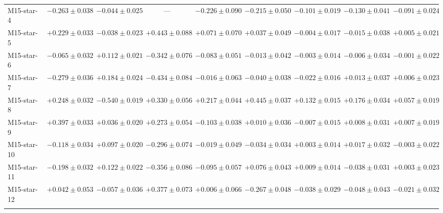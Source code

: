 \begin{table}
\begin{tabular*}{\textheight}{@{\extracolsep\fill}l c c c c c c c c@{}}
M15-star-4 & $-0.263 \pm 0.038$ & $-0.044 \pm 0.025$ & --- & $-0.226 \pm 0.090$ & $-0.215 \pm 0.050$ & $-0.101 \pm 0.019$ & $-0.130 \pm 0.041$ & $-0.091 \pm 0.024$ \\ 
M15-star-5 & $+0.229 \pm 0.033$ & $-0.038 \pm 0.023$ & $+0.443 \pm 0.088$ & $+0.071 \pm 0.070$ & $+0.037 \pm 0.049$ & $-0.004 \pm 0.017$ & $-0.015 \pm 0.038$ & $+0.005 \pm 0.021$ \\ 
M15-star-6 & $-0.065 \pm 0.032$ & $+0.112 \pm 0.021$ & $-0.342 \pm 0.076$ & $-0.083 \pm 0.051$ & $-0.013 \pm 0.042$ & $-0.003 \pm 0.014$ & $-0.006 \pm 0.034$ & $-0.001 \pm 0.022$ \\ 
M15-star-7 & $-0.279 \pm 0.036$ & $+0.184 \pm 0.024$ & $-0.434 \pm 0.084$ & $-0.016 \pm 0.063$ & $-0.040 \pm 0.038$ & $-0.022 \pm 0.016$ & $+0.013 \pm 0.037$ & $+0.006 \pm 0.023$ \\ 
M15-star-8 & $+0.248 \pm 0.032$ & $-0.540 \pm 0.019$ & $+0.330 \pm 0.056$ & $+0.217 \pm 0.044$ & $+0.445 \pm 0.037$ & $+0.132 \pm 0.015$ & $+0.176 \pm 0.034$ & $+0.057 \pm 0.019$ \\ 
M15-star-9 & $+0.397 \pm 0.033$ & $+0.036 \pm 0.020$ & $+0.273 \pm 0.054$ & $-0.103 \pm 0.038$ & $+0.010 \pm 0.036$ & $-0.007 \pm 0.015$ & $+0.008 \pm 0.031$ & $+0.007 \pm 0.019$ \\ 
M15-star-10 & $-0.118 \pm 0.034$ & $+0.097 \pm 0.020$ & $-0.296 \pm 0.074$ & $-0.019 \pm 0.049$ & $-0.034 \pm 0.034$ & $+0.003 \pm 0.014$ & $+0.017 \pm 0.032$ & $-0.003 \pm 0.022$ \\ 
M15-star-11 & $-0.198 \pm 0.032$ & $+0.122 \pm 0.022$ & $-0.356 \pm 0.086$ & $-0.095 \pm 0.057$ & $+0.076 \pm 0.043$ & $+0.009 \pm 0.014$ & $-0.038 \pm 0.031$ & $+0.003 \pm 0.023$ \\ 
M15-star-12 & $+0.042 \pm 0.053$ & $-0.057 \pm 0.036$ & $+0.377 \pm 0.073$ & $+0.006 \pm 0.066$ & $-0.267 \pm 0.048$ & $-0.038 \pm 0.029$ & $-0.048 \pm 0.043$ & $-0.021 \pm 0.032$ \\ 
\botrule
\end{tabular*}
\end{table}